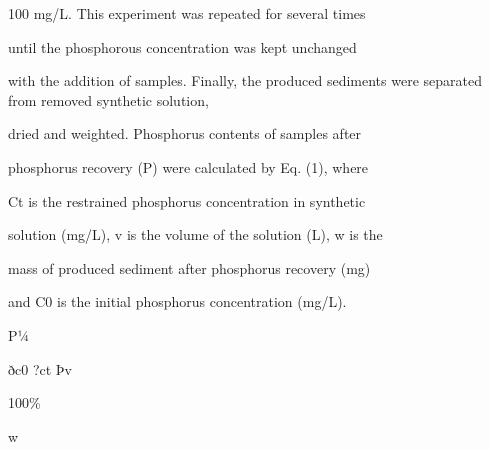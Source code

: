 \documentclass[a4paper,portrait,12pt]{article}
\begin{document}
\begin{flushleft}
100 mg/L. This experiment was repeated for several times
\end{flushleft}


\begin{flushleft}
until the phosphorous concentration was kept unchanged
\end{flushleft}


\begin{flushleft}
with the addition of samples. Finally, the produced sediments were separated from removed synthetic solution,
\end{flushleft}


\begin{flushleft}
dried and weighted. Phosphorus contents of samples after
\end{flushleft}


\begin{flushleft}
phosphorus recovery (P) were calculated by Eq. (1), where
\end{flushleft}


\begin{flushleft}
Ct is the restrained phosphorus concentration in synthetic
\end{flushleft}


\begin{flushleft}
solution (mg/L), v is the volume of the solution (L), w is the
\end{flushleft}


\begin{flushleft}
mass of produced sediment after phosphorus recovery (mg)
\end{flushleft}


\begin{flushleft}
and C0 is the initial phosphorus concentration (mg/L).
\end{flushleft}


\begin{flushleft}
P¼
\end{flushleft}





\begin{flushleft}
ðc0 ?ct Þv
\end{flushleft}


100\%


\begin{flushleft}
w
\end{flushleft}
\end{document}
